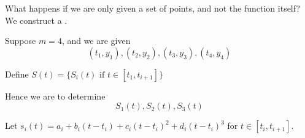 What happens if we are only given a set of points, and not the function itself? We construct a .

\begin{example}
    Suppose \( m = 4 \), and we are given \[
        (t_1, y_1), (t_2, y_2), (t_3, y_3), (t_4, y_4)
    \]

    Define \( S(t) = \{ S_i(t) \text{ if } t \in [t_1, t_{i+1}] \} \)

    Hence we are to determine \[
        S_1(t), S_2(t), S_3(t)
    \]

    Let \( s_i(t) = a_i + b_i(t - t_i) + c_i(t - t_i)^2 + d_i(t - t_i)^3 \) for \( t \in [t_i, t_{i+1}] \).
\end{example}


